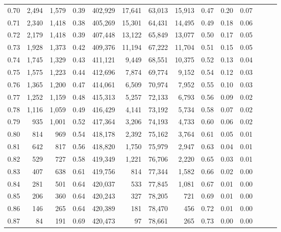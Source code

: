 \begin{tabular}{rrrrrrrrrrrrrr}
0.70 &   2,494 &  1,579 &  0.39 &  402,929 &   17,641 &  63,013 &  15,913 &  0.47 &  0.20 &      0.07 \\
0.71 &   2,340 &  1,418 &  0.38 &  405,269 &   15,301 &  64,431 &  14,495 &  0.49 &  0.18 &      0.06 \\
0.72 &   2,179 &  1,418 &  0.39 &  407,448 &   13,122 &  65,849 &  13,077 &  0.50 &  0.17 &      0.05 \\
0.73 &   1,928 &  1,373 &  0.42 &  409,376 &   11,194 &  67,222 &  11,704 &  0.51 &  0.15 &      0.05 \\
0.74 &   1,745 &  1,329 &  0.43 &  411,121 &    9,449 &  68,551 &  10,375 &  0.52 &  0.13 &      0.04 \\
0.75 &   1,575 &  1,223 &  0.44 &  412,696 &    7,874 &  69,774 &   9,152 &  0.54 &  0.12 &      0.03 \\
0.76 &   1,365 &  1,200 &  0.47 &  414,061 &    6,509 &  70,974 &   7,952 &  0.55 &  0.10 &      0.03 \\
0.77 &   1,252 &  1,159 &  0.48 &  415,313 &    5,257 &  72,133 &   6,793 &  0.56 &  0.09 &      0.02 \\
0.78 &   1,116 &  1,059 &  0.49 &  416,429 &    4,141 &  73,192 &   5,734 &  0.58 &  0.07 &      0.02 \\
0.79 &     935 &  1,001 &  0.52 &  417,364 &    3,206 &  74,193 &   4,733 &  0.60 &  0.06 &      0.02 \\
0.80 &     814 &    969 &  0.54 &  418,178 &    2,392 &  75,162 &   3,764 &  0.61 &  0.05 &      0.01 \\
0.81 &     642 &    817 &  0.56 &  418,820 &    1,750 &  75,979 &   2,947 &  0.63 &  0.04 &      0.01 \\
0.82 &     529 &    727 &  0.58 &  419,349 &    1,221 &  76,706 &   2,220 &  0.65 &  0.03 &      0.01 \\
0.83 &     407 &    638 &  0.61 &  419,756 &      814 &  77,344 &   1,582 &  0.66 &  0.02 &      0.00 \\
0.84 &     281 &    501 &  0.64 &  420,037 &      533 &  77,845 &   1,081 &  0.67 &  0.01 &      0.00 \\
0.85 &     206 &    360 &  0.64 &  420,243 &      327 &  78,205 &     721 &  0.69 &  0.01 &      0.00 \\
0.86 &     146 &    265 &  0.64 &  420,389 &      181 &  78,470 &     456 &  0.72 &  0.01 &      0.00 \\
0.87 &      84 &    191 &  0.69 &  420,473 &       97 &  78,661 &     265 &  0.73 &  0.00 &      0.00 \\

\end{tabular}
